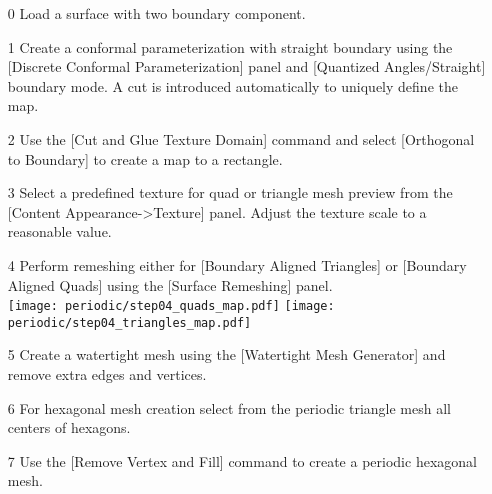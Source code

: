 \documentclass[Thesis.tex]{subfiles}
\begin{document}
\begin{itemize}
\item[0] Load a surface with two boundary component.
\item[1] Create a conformal parameterization with straight boundary using the [Discrete Conformal Parameterization] panel and [Quantized Angles/Straight] boundary mode. A cut is introduced automatically to uniquely define the map.
\item[2] Use the [Cut and Glue Texture Domain] command and select [Orthogonal to Boundary] to create a map to a rectangle.\\
\item[3] Select a predefined texture for quad or triangle mesh preview from the [Content Appearance->Texture] panel. Adjust the texture scale to a reasonable value.
\item[4] Perform remeshing either for [Boundary Aligned Triangles] or [Boundary Aligned Quads] using the [Surface Remeshing] panel.\\
\texttt{[image: periodic/step04\_quads\_map.pdf]}
\texttt{[image: periodic/step04\_triangles\_map.pdf]}
\item[5] Create a watertight mesh using the [Watertight Mesh Generator] and remove extra edges and vertices.
\item[6] For hexagonal mesh creation select from the periodic triangle mesh all centers of hexagons. 
\item[7] Use the [Remove Vertex and Fill] command to create a periodic hexagonal mesh.
\end{itemize}
\end{document}
